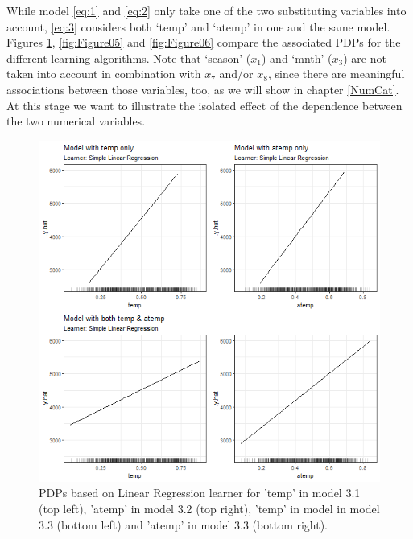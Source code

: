 \documentclass[
]{krantz}
\begin{document}
While model \eqref{eq:1} and \eqref{eq:2} only take one of the two substituting variables into account, \eqref{eq:3} considers both `temp' and `atemp' in one and the same model. Figures \ref{fig:Figure04}, \ref{fig:Figure05} and \ref{fig:Figure06} compare the associated PDPs for the different learning algorithms. Note that `season' (\(x_1\)) and `mnth' (\(x_3\)) are not taken into account in combination with \(x_7\) and/or \(x_8\), since there are meaningful associations between those variables, too, as we will show in chapter \ref{NumCat}. At this stage we want to illustrate the isolated effect of the dependence between the two numerical variables.

\begin{figure}

{\centering \includegraphics[width=0.8\linewidth]{images/VK_PDP_4_Correlated_numerical_LM} 

}

\caption{PDPs based on Linear Regression learner for 'temp' in model 3.1 (top left), 'atemp' in model 3.2 (top right), 'temp' in model in model 3.3 (bottom left) and 'atemp' in model 3.3 (bottom right).}\label{fig:Figure04}
\end{figure}
\end{document}
